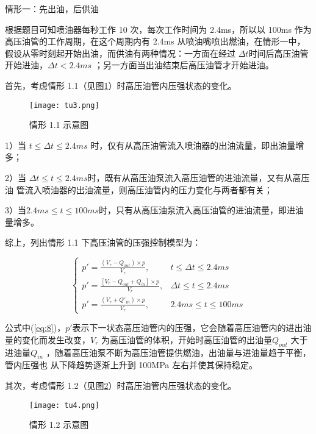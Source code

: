 \documentclass{cumcmthesis}
\begin{document}
{\heiti 情形一：先出油，后供油} 

根据题目可知喷油器每秒工作 10 次，每次工作时间为 2.4ms，所以以 100ms 作为 高压油管的工作周期，在这个周期内有 2.4ms 从喷油嘴喷出燃油，在情形一中，假设从零时刻起开始出油，而供油有两种情况：一方面在经过 $\Delta t$时间后高压油管开始进油，$\Delta t<2.4 ms$ ；另一方面当出油结束后高压油管才开始进油。 

首先，考虑情形 1.1（见图\ref{fig:3}）时高压油管内压强状态的变化。

\begin{figure}[htb] \centering 
	
	\texttt{[image: tu3.png]} 
	
	\caption{情形 1.1 示意图 } \label{fig:3} \end{figure} 

1）当 $t\le\Delta t \le2.4ms$ 时，仅有从高压油管流入喷油器的出油流量，即出油量增多；

 2）当 $\Delta t\leq t\le 2.4ms $时，既有从高压油泵流入高压油管的进油流量，又有从高压油 管流入喷油器的出油流量，则高压油管内的压力变化与两者都有关； 
 
 3）当$2.4ms\leq t \le100ms$时，只有从高压油泵流入高压油管的进油流量，即进油量增多。 
 
 综上，列出情形 1.1 下高压油管的压强控制模型为： 

  \begin{equation}
 \begin{cases}
 p'=\frac{\left({V_{r}-Q_{out}}\right) \times p}{V_{r}},&t\le \Delta t \le 2.4ms\\
 p'=\frac{\left[ V_{r}-Q_{out}+Q_{in} \right] \times p}{V_{r}},&\Delta t \leq t \le 2.4ms\\
 p'=\frac{\left( V_{r}+Q'_{in} \right)\times p}{V_{r}},&2.4ms\leq t \le 100ms 
 \end{cases}\label{eq:8}
 \end{equation}
 
公式中(\ref{eq:8})，$p'$表示下一状态高压油管内的压强，它会随着高压油管内的进出油量的变化而发生改变，$V_{r}$ 为高压油管的体积，开始时高压油管的出油量$Q_{out}$ 大于进油量$Q_{in}$ ，随着高压油泵不断为高压油管提供燃油，出油量与进油量趋于平衡，管内压强也 从下降趋势逐渐上升到 100MPa 左右并使其保持稳定。 


其次，考虑情形 1.2（见图\ref{fig:4}）时高压油管内压强状态的变化。
\begin{figure}[htb] \centering 
	
	\texttt{[image: tu4.png]} 
	
	\caption{情形 1.2 示意图 } \label{fig:4} \end{figure} 
\end{document}
